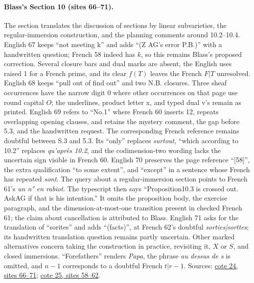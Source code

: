 \documentclass[10pt,a4paper]{article}
\begin{document}
\paragraph{Blass's Section 10 (sites 66--71).}
The section translates the discussion of sections by linear subvarieties, the regular-immersion construction, and the planning comments around 10.2--10.4. English 67 keeps ``not meeting k'' and adds ``(Z AG's error P.B.)'' with a handwritten question; French 58 indeed has $k$, so this remains Blass's proposed correction. Several closure bars and dual marks are absent, the English uses raised 1 for a French prime, and its clear $f(T)$ leaves the French $F|T$ unresolved. English 68 keeps ``pull out of find out'' and two N.B. closures. Three sheaf occurrences have the narrow digit $0$ where other occurrences on that page use round capital $O$; the underlines, product letter x, and typed dual v's remain as printed. English 69 refers to ``No.1'' where French 60 inserts 12, repeats overlapping opening clauses, and retains the mystery comment, the gap before 5.3, and the handwritten request. The corresponding French reference remains doubtful between S.3 and 5.3. Its ``only'' replaces \emph{surtout}, ``which according to 10.2'' replaces \emph{qu'après 10.2}, and the codimension-two wording lacks the uncertain sign visible in French 60. English 70 preserves the page reference ``[58]'', the extra qualification ``to some extent'', and ``except'' in a sentence whose French has repeated \emph{sont}. The query about a regular-immersion section points to French 61's \emph{un n° en rabiot}. The typescript then says ``Proposition10.3 is crossed out. AskAG if that is his intention.'' It omits the proposition body, the exercise paragraph, and the dimension-at-most-one transition present in checked French 61; the claim about cancellation is attributed to Blass. English 71 asks for the translation of ``sorites'' and adds ``(facts)'', at French 62's doubtful \emph{sorties|sorttes}; its handwritten translation question remains partly uncertain. Other marked alternatives concern taking the construction in practice, revisiting it, $X$ or $S$, and closed immersions. ``Forefathers'' renders \emph{Papa}, the phrase \emph{au dessus de s} is omitted, and $n-1$ corresponds to a doubtful French $t|r-1$. Sources: \href{https://grothendieck.umontpellier.fr/web/viewer.html?file=../24.pdf\#page=67}{cote 24, sites 66--71}; \href{https://grothendieck.umontpellier.fr/web/viewer.html?file=../25.pdf\#page=59}{cote 25, sites 58--62}.
\end{document}
